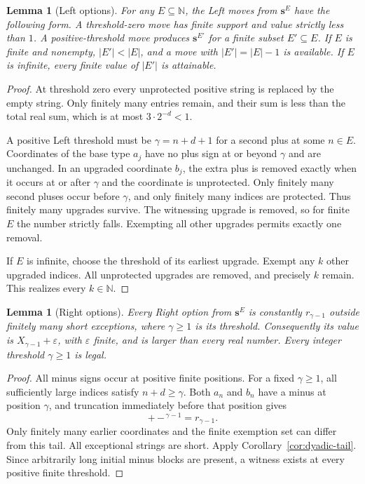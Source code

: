\documentclass[11pt,letterpaper]{article}
\newtheorem{lemma}[theorem]{Lemma}
\theoremstyle{definition}
\theoremstyle{remark}
\newcommand{\NN}{\mathbb N}
\newcommand{\bs}{\boldsymbol{s}}
\newcommand{\signplus}{\mathtt{+}}
\newcommand{\signminus}{\mathtt{-}}
\begin{document}
\begin{lemma}[Left options]\label{lem:left-family}
For any $E\subseteq\NN$, the Left moves from $\bs^E$ have the following form.
A threshold-zero move has finite support and value strictly less than $1$.
A positive-threshold move produces $\bs^{E'}$ for a finite subset $E'\subseteq E$.
If $E$ is finite and nonempty, $|E'|<|E|$, and a move with
$|E'|=|E|-1$ is available. If $E$ is infinite, every finite value of $|E'|$ is
attainable.
\end{lemma}
\begin{proof}
At threshold zero every unprotected positive string is replaced by the empty
string. Only finitely many entries remain, and their sum is less than the total
real sum, which is at most $3\cdot2^{-d}<1$.

A positive Left threshold must be $\gamma=n+d+1$ for a second plus at some
$n\in E$. Coordinates of the base type $a_j$ have no plus sign at or beyond
$\gamma$ and are unchanged. In an upgraded coordinate $b_j$, the extra plus is
removed exactly when it occurs at or after $\gamma$ and the coordinate is
unprotected. Only finitely many second pluses occur before $\gamma$, and only
finitely many indices are protected. Thus finitely many upgrades survive.
The witnessing upgrade is removed, so for finite $E$ the number strictly
falls. Exempting all other upgrades permits exactly one removal.

If $E$ is infinite, choose the threshold of its earliest upgrade. Exempt any
$k$ other upgraded indices. All unprotected upgrades are removed, and precisely
$k$ remain. This realizes every $k\in\NN$.
\end{proof}

\begin{lemma}[Right options]\label{lem:right-family}
Every Right option from $\bs^E$ is constantly $r_{\gamma-1}$ outside finitely
many short exceptions, where $\gamma\geq1$ is its threshold. Consequently its
value is $X_{\gamma-1}+\varepsilon$, with $\varepsilon$ finite, and is larger
than every real number. Every integer threshold $\gamma\geq1$ is legal.
\end{lemma}
\begin{proof}
All minus signs occur at positive finite positions. For a fixed $\gamma\geq1$,
all sufficiently large indices satisfy $n+d\geq\gamma$. Both $a_n$ and $b_n$
have a minus at position $\gamma$, and truncation immediately before that
position gives
\[
                         \signplus\,\signminus^{\,\gamma-1}=r_{\gamma-1}.
\]
Only finitely many earlier coordinates and the finite exemption set can differ
from this tail. All exceptional strings are short. Apply
Corollary~\ref{cor:dyadic-tail}. Since arbitrarily long initial minus blocks are
present, a witness exists at every positive finite threshold.
\end{proof}
\end{document}
